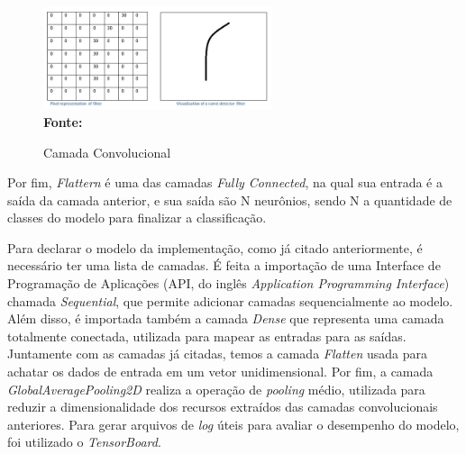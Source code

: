 \begin{figure}[ht]
 	\centering	
 	\caption[\hspace{0.1cm}Grade Computacional.]{Camada Convolucional}
 	\vspace{-0.4cm}
 	\includegraphics[width=0.6\textwidth]{figuras/conv3.png}
 	\captionsetup{justification=centering}
	\vspace{-0.2cm}
     \\\textbf{\footnotesize Fonte: \cite{cnns}}
	\label{fig:conv3}
\end{figure}

Por fim, \textit{Flattern} é uma das camadas \textit{Fully Connected}, na qual sua entrada é a saída da camada anterior, e sua saída são N neurônios, sendo N a quantidade de classes do modelo para finalizar a classificação.


Para declarar o modelo da implementação, como já citado anteriormente, é necessário ter uma lista de camadas. É feita a importação de uma Interface de Programação de Aplicações (API, do inglês \textit{Application Programming Interface}) chamada \textit{Sequential}, que permite adicionar camadas sequencialmente ao modelo. Além disso, é importada também a camada \textit{Dense} que representa uma camada totalmente conectada, utilizada para mapear as entradas para as saídas. Juntamente com as camadas já citadas, temos a camada \textit{Flatten} usada para achatar os dados de entrada em um vetor unidimensional. Por fim, a camada \textit{GlobalAveragePooling2D} realiza a operação de \textit{pooling} médio, utilizada para reduzir a dimensionalidade dos recursos extraídos das camadas convolucionais anteriores. Para gerar arquivos de \textit{log} úteis para avaliar o desempenho do modelo, foi utilizado o \textit{TensorBoard}.



